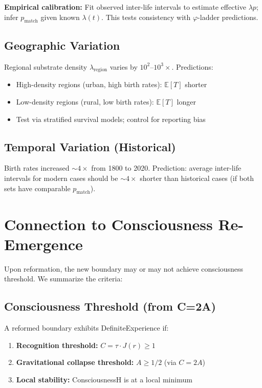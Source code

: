 \documentclass[11pt,letterpaper]{article}
\theoremstyle{definition}
\theoremstyle{remark}
\begin{document}
\textbf{Empirical calibration:} Fit observed inter-life intervals to estimate effective \(\lambda p\); infer \(p_{\text{match}}\) given known \(\lambda(t)\). This tests consistency with \(\varphi\)-ladder predictions.

\subsection{Geographic Variation}

Regional substrate density \(\lambda_{\text{region}}\) varies by \(10^2\)--\(10^3\times\). Predictions:
\begin{itemize}
  \item High-density regions (urban, high birth rates): \(\mathbb{E}[T]\) shorter
  \item Low-density regions (rural, low birth rates): \(\mathbb{E}[T]\) longer
  \item Test via stratified survival models; control for reporting bias
\end{itemize}

\subsection{Temporal Variation (Historical)}

Birth rates increased \(\sim\!4\times\) from 1800 to 2020. Prediction: average inter-life intervals for modern cases should be \(\sim\!4\times\) shorter than historical cases (if both sets have comparable \(p_{\text{match}}\)).

\section{Connection to Consciousness Re-Emergence}\label{app:consciousness}

Upon reformation, the new boundary may or may not achieve consciousness threshold. We summarize the criteria:

\subsection{Consciousness Threshold (from C=2A)}

A reformed boundary exhibits DefiniteExperience if:
\begin{enumerate}
  \item \textbf{Recognition threshold:} \(C = \tau\cdot J(r) \ge 1\)
  \item \textbf{Gravitational collapse threshold:} \(A \ge 1/2\) (via \(C=2A\))
  \item \textbf{Local stability:} ConsciousnessH is at a local minimum
\end{enumerate}
\end{document}
